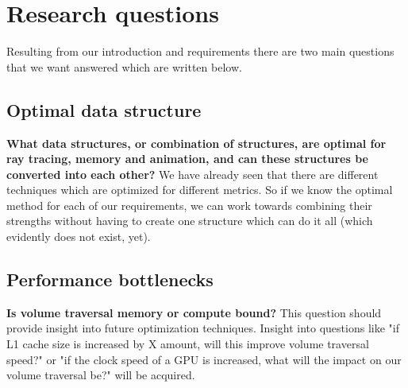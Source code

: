 \section{Research questions}\label{research_questions}
Resulting from our introduction and requirements there are two main questions that we want answered which are written below.

\subsection{Optimal data structure}\label{research_questions:optimal_data_structure}

\noindent\textbf{What data structures, or combination of structures, are optimal for ray tracing, memory and animation, and can these structures be converted into each other?} We have already seen that there are different techniques which are optimized for different metrics. So if we know the optimal method for each of our requirements, we can work towards combining their strengths without having to create one structure which can do it all (which evidently does not exist, yet).

\subsection{Performance bottlenecks}\label{research_questions:performance_bottlenecks}
\noindent\textbf{Is volume traversal memory or compute bound?} This question should provide insight into future optimization techniques. Insight into questions like "if L1 cache size is increased by X amount, will this improve volume traversal speed?" or "if the clock speed of a GPU is increased, what will the impact on our volume traversal be?" will be acquired.
